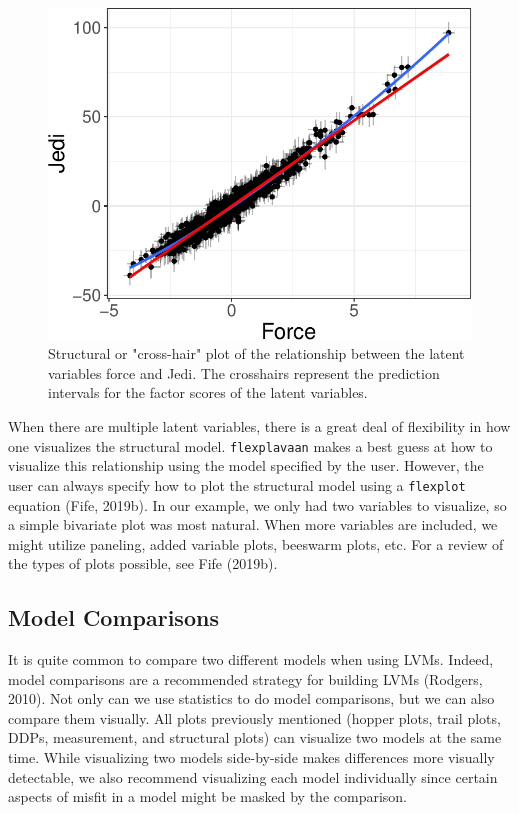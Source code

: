 \documentclass[
  english,
  man]{apa6}
\begin{document}
\begin{figure}

{\centering \includegraphics[width=0.5\linewidth]{flexplavaan_draft_files/figure-latex/beech-1} 

}

\caption{Structural or "cross-hair" plot of the relationship between the latent variables force and Jedi. The crosshairs represent the prediction intervals for the factor scores of the latent variables.}\label{fig:beech}
\end{figure}

When there are multiple latent variables, there is a great deal of flexibility in how one visualizes the structural model. \texttt{flexplavaan} makes a best guess at how to visualize this relationship using the model specified by the user. However, the user can always specify how to plot the structural model using a \texttt{flexplot} equation (Fife, 2019b). In our example, we only had two variables to visualize, so a simple bivariate plot was most natural. When more variables are included, we might utilize paneling, added variable plots, beeswarm plots, etc. For a review of the types of plots possible, see Fife (2019b).

\hypertarget{model-comparisons}{%
\subsection{Model Comparisons}\label{model-comparisons}}

It is quite common to compare two different models when using LVMs. Indeed, model comparisons are a recommended strategy for building LVMs (Rodgers, 2010). Not only can we use statistics to do model comparisons, but we can also compare them visually. All plots previously mentioned (hopper plots, trail plots, DDPs, measurement, and structural plots) can visualize two models at the same time. While visualizing two models side-by-side makes differences more visually detectable, we also recommend visualizing each model individually since certain aspects of misfit in a model might be masked by the comparison.
\end{document}
